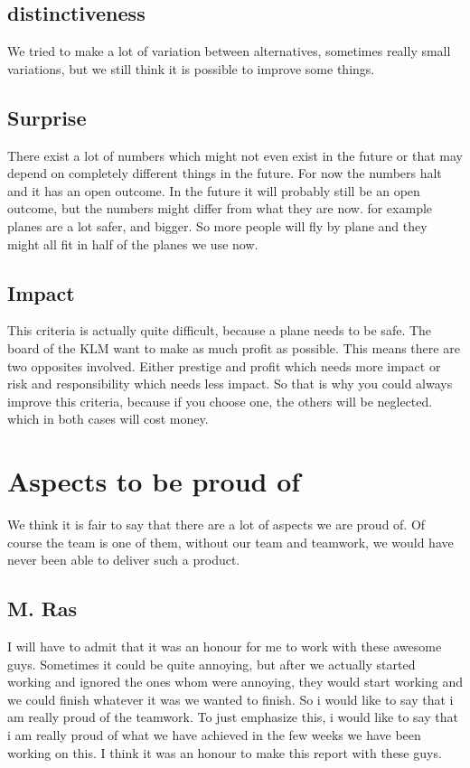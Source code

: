 \documentclass[a4paper, 11pt, notitlepage]{report}
\begin{document}
\section{distinctiveness}
    We tried to make a lot of variation between alternatives, sometimes really small variations, but we still think it is possible to improve some things.
\section{Surprise}
    There exist a lot of numbers which might not even exist in the future or that may depend on completely different things in the future. For now the numbers halt and it has an open outcome. In the future it will probably still be an open outcome, but the numbers might differ from what they are now. for example planes are a lot safer, and bigger. So more people will fly by plane and they might all fit in half of the planes we use now.
\section{Impact}
    This criteria is actually quite difficult, because a plane needs to be safe. The board of the KLM want to make as much profit as possible. This means there are two opposites involved. Either prestige and profit which needs more impact or risk and responsibility which needs less impact. So that is why you could always improve this criteria, because if you choose one, the others will be neglected. which in both cases will cost money.
	
\chapter{Aspects to be proud of}
	We think it is fair to say that there are a lot of aspects we are proud of. Of course the team is one of them, without our team and teamwork, we would have never been able to deliver such a product.
	
	\section*{M. Ras}I will have to admit that it was an honour for me to work with these awesome guys. Sometimes it could be quite annoying, but after we actually started working and ignored the ones whom were annoying, they would start working and we could finish whatever it was we wanted to finish. So i would like to say that i am really proud of the teamwork. To just emphasize this, i would like to say that i am really proud of what we have achieved in the few weeks we have been working on this. I think it was an honour to make this report with these guys.
	
\end{document}
